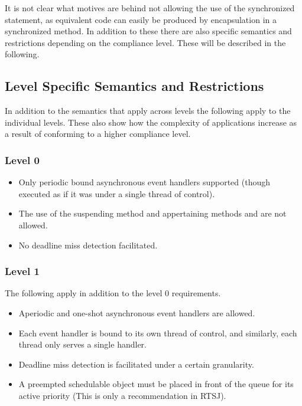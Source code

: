 It is not clear what motives are behind not allowing the use of the synchronized statement, as equivalent code can easily be produced by encapsulation in a synchronized method.
In addition to these there are also specific semantics and restrictions depending on the compliance level. These will be described in the following.


\subsection{Level Specific Semantics and Restrictions} %
\label{sub:level_specific_restrictions}
In addition to the semantics that apply across levels the following apply to the individual levels. These also show how the complexity of applications increase as a result of conforming to a higher compliance level.

\subsubsection{Level 0}
\begin{itemize}
	\item Only periodic bound asynchronous event handlers supported (though executed as if it was under a single thread of control).
	\item The use of the suspending method  and appertaining methods  and  are not allowed.
	\item No deadline miss detection facilitated.
\end{itemize}

\subsubsection{Level 1}
The following apply in addition to the level 0 requirements.
\begin{itemize}
	\item Aperiodic and one-shot asynchronous event handlers are allowed.
	\item Each event handler is bound to its own thread of control, and similarly, each thread only serves a single handler.
	\item Deadline miss detection is facilitated under a certain granularity.
	\item A preempted schedulable object must be placed in front of the queue for its active priority (This is only a recommendation in RTSJ).
\end{itemize}

